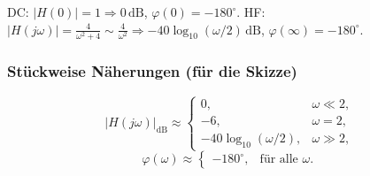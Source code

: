 \begin{description}[leftmargin=1.2em,labelsep=.6em,font=\bfseries]
\item[9. Grenzwerte und Konsistenz prüfen.]
DC: \(|H(0)|=1\Rightarrow 0\,\mathrm{dB}\), \(\varphi(0)=-180^\circ\).
HF: \(|H(j\omega)|=\frac{4}{\omega^2+4}\sim \frac{4}{\omega^2}\Rightarrow -40\log_{10}(\omega/2)\,\mathrm{dB}\), \(\varphi(\infty)=-180^\circ\).

\end{description}

\subsubsection*{Stückweise Näherungen (für die Skizze)}
\[
|H(j\omega)|_{\mathrm{dB}}\approx
\begin{cases}
0,& \omega\ll 2,\\[2pt]
-6,& \omega=2,\\[2pt]
-40\log_{10}(\omega/2),& \omega\gg 2,
\end{cases}
\]
\[
\varphi(\omega)\approx
\begin{cases}
-180^\circ,& \text{für alle }\omega.
\end{cases}
\]

\newpage